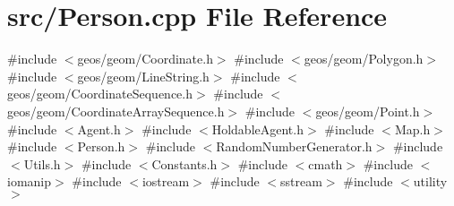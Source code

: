 \section{src/\+Person.cpp File Reference}
\label{_person_8cpp}
{\ttfamily \#include $<$geos/geom/\+Coordinate.\+h$>$}\newline
{\ttfamily \#include $<$geos/geom/\+Polygon.\+h$>$}\newline
{\ttfamily \#include $<$geos/geom/\+Line\+String.\+h$>$}\newline
{\ttfamily \#include $<$geos/geom/\+Coordinate\+Sequence.\+h$>$}\newline
{\ttfamily \#include $<$geos/geom/\+Coordinate\+Array\+Sequence.\+h$>$}\newline
{\ttfamily \#include $<$geos/geom/\+Point.\+h$>$}\newline
{\ttfamily \#include $<$Agent.\+h$>$}\newline
{\ttfamily \#include $<$Holdable\+Agent.\+h$>$}\newline
{\ttfamily \#include $<$Map.\+h$>$}\newline
{\ttfamily \#include $<$Person.\+h$>$}\newline
{\ttfamily \#include $<$Random\+Number\+Generator.\+h$>$}\newline
{\ttfamily \#include $<$Utils.\+h$>$}\newline
{\ttfamily \#include $<$Constants.\+h$>$}\newline
{\ttfamily \#include $<$cmath$>$}\newline
{\ttfamily \#include $<$iomanip$>$}\newline
{\ttfamily \#include $<$iostream$>$}\newline
{\ttfamily \#include $<$sstream$>$}\newline
{\ttfamily \#include $<$utility$>$}\newline
